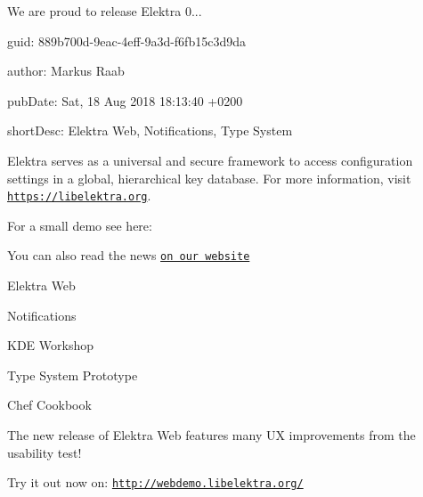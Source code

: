 We are proud to release Elektra 0...


\begin{DoxyItemize}
\item guid\+: 889b700d-\/9eac-\/4eff-\/9a3d-\/f6fb15c3d9da
\item author\+: Markus Raab
\item pub\+Date\+: Sat, 18 Aug 2018 18\+:13\+:40 +0200
\item short\+Desc\+: Elektra Web, Notifications, Type System
\end{DoxyItemize}

Elektra serves as a universal and secure framework to access configuration settings in a global, hierarchical key database. For more information, visit \href{https://libelektra.org}{\tt https\+://libelektra.\+org}.

For a small demo see here\+:

\href{https://asciinema.org/a/cantr04assr4jkv8v34uz9b8r}{\tt }

You can also read the news \href{https://www.libelektra.org/news/0.8.24-release}{\tt on our website}


\begin{DoxyItemize}
\item Elektra Web
\item Notifications
\item K\+DE Workshop
\item Type System Prototype
\item Chef Cookbook
\end{DoxyItemize}

The new release of Elektra Web features many UX improvements from the usability test!

\href{https://www.youtube.com/watch?v=lLg9sk6Hx-E}{\tt }

Try it out now on\+: \href{http://webdemo.libelektra.org/}{\tt http\+://webdemo.\+libelektra.\+org/}



